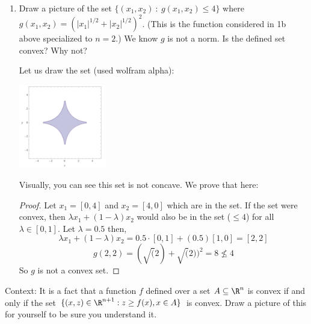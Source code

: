 \documentclass[shortlabels]{article}
\begin{document}
\begin{bprob}
\begin{enumerate}
        \newpage

        \item {} Draw a picture of the set $\{ (x_1,x_2) ~: ~ g(x_1,x_2) \le 4 \}$
        where $g(x_1, x_2)  = \left( |x_1|^{1/2} + |x_2|^{1/2}\right)^2$. (This is the function considered in 1b above specialized to $n=2$.) We know $g$ is not a norm. Is the defined set convex? Why not?
    
        Let us draw the set (used wolfram alpha):

            \centering
            \includegraphics[width=0.3\textwidth]{../hw2-code/convex_sets_B1.png}


        Visually, you can see this set is not concave. We prove that here: 
        \begin{proof}
        Let
        $x_1 = [0,4]$ and $x_2 = [4,0]$ which are in the set. If the set were convex, 
        then $\lambda x_1 + (1-\lambda) x_2 $ would also be in the set ($\leq 4$) for all $\lambda \in [0,1]$.
        Let $\lambda = 0.5$ then,
        $$ \lambda x_1 + (1-\lambda) x_2 = 0.5 \cdot [0,1] + (0.5) [1,0] = [2, 2] $$
        $$ g(2,2) = (\sqrt(2)+\sqrt(2))^2 = 8 \nleq 4 $$
        So $g$ is not a convex set.
        \end{proof}

    \end{enumerate}
    Context: It is a fact that a function $f$ defined over a set $A \subseteq \R^n$ is convex if and only if the set $\{ (x, z) \in \R^{n+1} : z \geq f(x), x \in A \}$ is convex. Draw a picture of this for yourself to be sure you understand it.

\end{bprob}
\newpage
\end{document}
